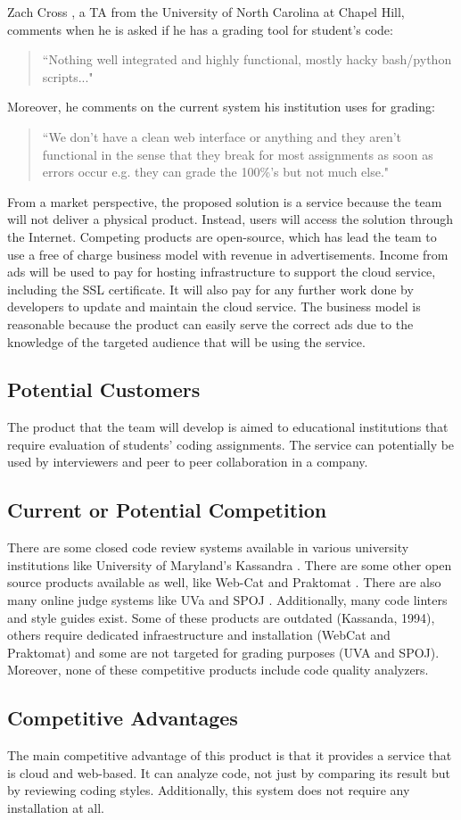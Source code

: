 
Zach Cross \cite{Zach}, a TA from the
University of North Carolina at Chapel Hill, comments when he is asked if he has
a grading tool for student's code: \begin{quote} ``Nothing well integrated and
highly functional, mostly hacky bash/python scripts..." \end{quote} Moreover, he
comments on the current system his institution uses for grading: \begin{quote}
``We don't have a clean web interface or anything and they aren't functional in
the sense that they break for most assignments as soon as errors occur e.g. they
can grade the 100\%'s but not much else." \end{quote}

From a market perspective, the proposed solution is a service because the team
will not deliver a physical product. Instead, users will access the solution
through the Internet. Competing products are open-source, which has lead the
team to use a free of charge business model with revenue in advertisements.
Income from ads will be used to pay for hosting infrastructure to support the
cloud service, including the SSL certificate. It will also pay for any further
work done by developers to update and maintain the cloud service. The business
model is reasonable because the product can easily serve the correct ads due to
the knowledge of the targeted audience that will be using the service.

\subsection{Potential Customers}

The product that the team will develop is aimed to educational institutions that
require evaluation of students' coding assignments. The service can potentially
be used by interviewers and peer to peer collaboration in a company.

\subsection{Current or Potential Competition}

There are some closed code review systems available in various university
institutions like University of Maryland's Kassandra \cite{Matt1994}. There are
some other open source products available as well, like Web-Cat \cite{WebCat}
and Praktomat \cite{Praktomat}. There are also many online judge systems like
UVa \cite{UVA} and SPOJ \cite{SPOJ}. Additionally, many code linters and style
guides exist. Some of these products are outdated (Kassanda, 1994), others
require dedicated infraestructure and installation (WebCat and Praktomat) and
some are not targeted for grading purposes (UVA and SPOJ). Moreover,
none of these competitive products include code quality analyzers.

\subsection{Competitive Advantages}

The main competitive advantage of this product is that it provides a service
that is cloud and web-based. It can analyze code, not just by comparing its
result but by reviewing coding styles. Additionally, this system does not
require any installation at all.
